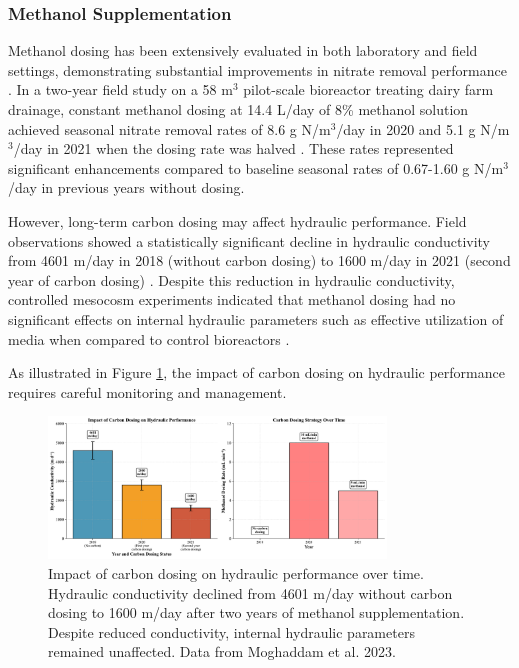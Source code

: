 \documentclass[12pt,a4paper]{article}
\begin{document}
\subsubsection{Methanol Supplementation}

Methanol dosing has been extensively evaluated in both laboratory and field settings, demonstrating substantial improvements in nitrate removal performance \citep{RN632}. In a two-year field study on a 58 m$^3$ pilot-scale bioreactor treating dairy farm drainage, constant methanol dosing at 14.4 L/day of 8\% methanol solution achieved seasonal nitrate removal rates of 8.6 g N/m$^3$/day in 2020 and 5.1 g N/m$^3$/day in 2021 when the dosing rate was halved \citep{RN632}. These rates represented significant enhancements compared to baseline seasonal rates of 0.67-1.60 g N/m$^3$/day in previous years without dosing.

However, long-term carbon dosing may affect hydraulic performance. Field observations showed a statistically significant decline in hydraulic conductivity from 4601 m/day in 2018 (without carbon dosing) to 1600 m/day in 2021 (second year of carbon dosing) \citep{RN632}. Despite this reduction in hydraulic conductivity, controlled mesocosm experiments indicated that methanol dosing had no significant effects on internal hydraulic parameters such as effective utilization of media when compared to control bioreactors \citep{RN632}.

As illustrated in Figure \ref{fig:hydraulic_performance}, the impact of carbon dosing on hydraulic performance requires careful monitoring and management.

\begin{figure}[ht]
\centering
\includegraphics[width=0.8\textwidth]{fig3_hydraulic_performance_scientific}
\caption{Impact of carbon dosing on hydraulic performance over time. Hydraulic conductivity declined from 4601 m/day without carbon dosing to 1600 m/day after two years of methanol supplementation. Despite reduced conductivity, internal hydraulic parameters remained unaffected. Data from Moghaddam et al. 2023.}
\label{fig:hydraulic_performance}
\end{figure}
\end{document}
